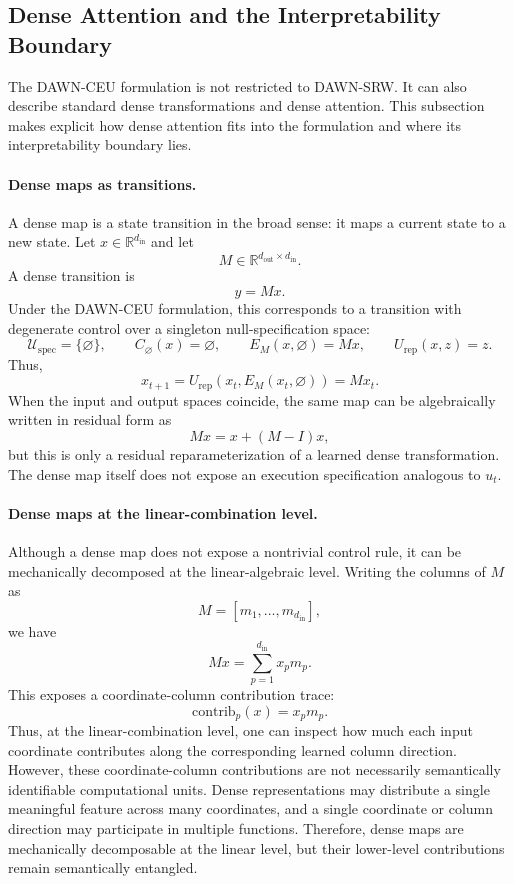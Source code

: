 \documentclass{article}
\begin{document}
\subsection{Dense Attention and the Interpretability Boundary}
\label{app:dense_attention_ceu}

The DAWN-CEU formulation is not restricted to DAWN-SRW. It can also describe standard dense transformations and dense attention. This subsection makes explicit how dense attention fits into the formulation and where its interpretability boundary lies.

\paragraph{Dense maps as transitions.}
A dense map is a state transition in the broad sense: it maps a current state to a new state. Let \(x\in\mathbb{R}^{d_{\mathrm{in}}}\) and let
\[
M\in\mathbb{R}^{d_{\mathrm{out}}\times d_{\mathrm{in}}}.
\]
A dense transition is
\[
y = Mx.
\]
Under the DAWN-CEU formulation, this corresponds to a transition with degenerate control over a singleton null-specification space:
\[
\mathcal{U}_{\mathrm{spec}}=\{\varnothing\},\qquad
C_{\varnothing}(x)=\varnothing,\qquad
E_M(x,\varnothing)=Mx,\qquad
U_{\mathrm{rep}}(x,z)=z.
\]
Thus,
\[
x_{t+1}=U_{\mathrm{rep}}(x_t,E_M(x_t,\varnothing))=Mx_t.
\]
When the input and output spaces coincide, the same map can be algebraically written in residual form as
\[
Mx = x + (M-I)x,
\]
but this is only a residual reparameterization of a learned dense transformation. The dense map itself does not expose an execution specification analogous to \(u_t\).

\paragraph{Dense maps at the linear-combination level.}
Although a dense map does not expose a nontrivial control rule, it can be mechanically decomposed at the linear-algebraic level. Writing the columns of \(M\) as
\[
M=[m_1,\ldots,m_{d_{\mathrm{in}}}],
\]
we have
\[
Mx=\sum_{p=1}^{d_{\mathrm{in}}}x_p m_p.
\]
This exposes a coordinate-column contribution trace:
\[
\mathrm{contrib}_p(x)=x_p m_p.
\]
Thus, at the linear-combination level, one can inspect how much each input coordinate contributes along the corresponding learned column direction. However, these coordinate-column contributions are not necessarily semantically identifiable computational units. Dense representations may distribute a single meaningful feature across many coordinates, and a single coordinate or column direction may participate in multiple functions. Therefore, dense maps are mechanically decomposable at the linear level, but their lower-level contributions remain semantically entangled.
\end{document}
